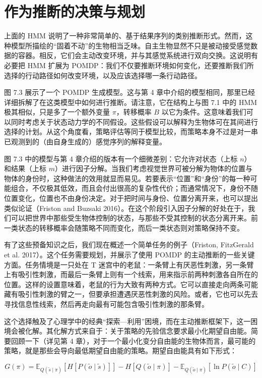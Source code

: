 \section{作为推断的决策与规划}

上面的 HMM 说明了一种非常简单的、基于结果序列的类别推断形式。然而，这种模型所描绘的“固着不动”的生物相当乏味。自主生物显然不只是被动接受感觉数据的容器。相反，它们会主动改变环境，并与其感觉系统进行双向交换。这说明有必要把 HMM 扩展为 POMDP：我们不仅要推断环境如何变化，还要推断我们所选择的行动路径如何改变环境，以及应该选择哪一条行动路径。

图 7.3 展示了一个 POMDP 生成模型。这与第 4 章中介绍的模型相同，那里已经详细拆解了在这类模型中如何进行推断。请注意，它在结构上与图 7.1 中的 HMM 极其相似，只是多了一个额外变量 $\pi$，转移概率 $B$ 以它为条件。这意味着我们可以同时考虑关于状态动力学的不同假设。这些假设可以解释为生物体可在其间进行选择的计划。从这个角度看，策略评估等同于模型比较，而策略本身不过是对一串已观测到的（由自身生成的）感觉序列的解释变量。

图 7.3 中的模型与第 4 章介绍的版本有一个细微差别：它允许对状态（上标 $n$）和结果（上标 $m$）进行因子分解。当我们考虑视觉世界可被分解为物体的位置与物体的身份时，这种做法的效用就显而易见。若要表示“位置”和“身份”的每一种可能组合，不仅极其低效，而且会付出很高的复杂性代价；而通常情况下，身份不随位置变化，位置也不由身份决定。对于把时间与身份、位置分离开来，也可以提出类似论证（Friston and Buzsaki 2016）。在这个阶段引入因子分解的好处在于，我们可以把世界中那些受生物体控制的状态，与那些不受其控制的状态分离开来。前一类状态的转移概率会随策略不同而变化，而后一类状态则对策略保持不变。

有了这些预备知识之后，我们现在概述一个简单任务的例子（Friston, FitzGerald et al. 2017）。这个任务需要规划，并展示了使用 POMDP 的主动推断的一些关键方面。任务情境是一只处在 T 迷宫中的老鼠：一条臂上有厌恶性刺激，另一条臂上有吸引性刺激，而最后一条臂上则有一个线索，用来指示前两种刺激各自所在的位置。这样的设置意味着，老鼠的行为大致有两种方式。它可以直接走向两条可能藏有吸引性刺激的臂之一，但要承担遭遇厌恶性刺激的风险。或者，它也可以先去寻找信息性线索，然后再走向最有可能包含吸引性刺激的那条臂。

这个选择触及了心理学中的经典“探索---利用”困境，而在主动推断框架下，这一困境会被化解。其化解方式来自于：关于策略的先验信念要求最小化期望自由能。简要回顾一下（详见第 4 章），对于一个最小化变分自由能的生物体而言，最可能的策略，就是那些会导向最低期望自由能的策略。期望自由能具有如下形式：

\begin{equation}
G(\pi)=\mathbb{E}_{Q(\tilde{s}\mid \pi)}\!\left[H\!\left[P(\tilde{o}\mid \tilde{s})\right]\right]-H\!\left[Q(\tilde{o}\mid \pi)\right]-\mathbb{E}_{Q(\tilde{o}\mid \pi)}\!\left[\ln P(\tilde{o}\mid C)\right]
\label{eq:chapter7-G}
\end{equation}

